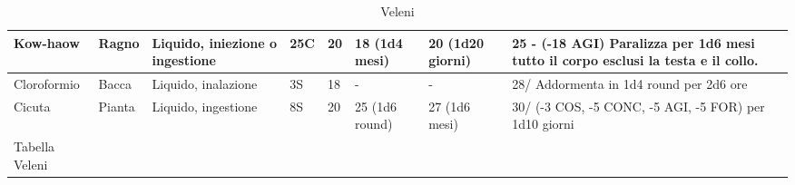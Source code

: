 {\begin{longtable}{|l|p{2cm}|p{2.3cm}|l|l|p{1.1cm}|p{1.1cm}|p{5.0cm}|}
  Kow-haow & \raggedright Ragno & \raggedright Liquido, iniezione o ingestione & \raggedright 25C & \raggedright 20 & \raggedright 18 (1d4 mesi) & \raggedright 20 (1d20 giorni) & \raggedright 25 - (-18 AGI) Paralizza per 1d6 mesi tutto il corpo esclusi la testa e il collo.\tabularnewline \hline
  Cloroformio & \raggedright Bacca & \raggedright Liquido, inalazione  & \raggedright 3S & \raggedright 18 & \raggedright - & \raggedright - & \raggedright 28/ Addormenta in 1d4 round per 2d6 ore\tabularnewline \hline
  Cicuta & \raggedright Pianta & \raggedright Liquido, ingestione & \raggedright 8S & \raggedright 20 & \raggedright 25 (1d6 round) & \raggedright 27 (1d6 mesi) & \raggedright 30/ (-3 COS, -5 CONC, -5 AGI, -5 FOR) per 1d10 giorni \tabularnewline \hline
  \caption{Veleni}{Tabella Veleni}\tabularnewline
\end{longtable}
}


